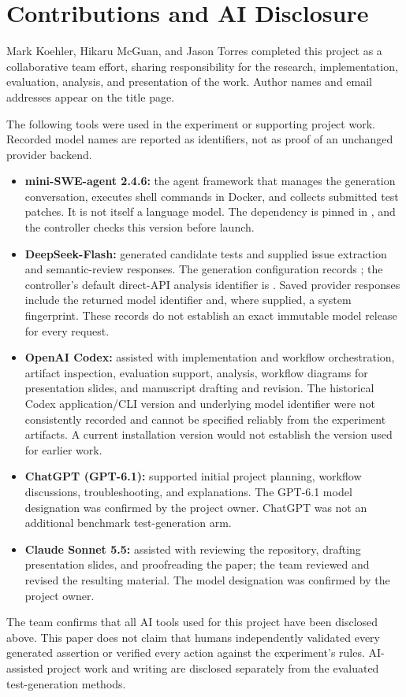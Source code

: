 \section{Contributions and AI Disclosure}\label{app:disclosure}
Mark Koehler, Hikaru McGuan, and Jason Torres completed this project as a collaborative team effort, sharing responsibility for the research, implementation, evaluation, analysis, and presentation of the work. Author names and email addresses appear on the title page.

The following tools were used in the experiment or supporting project work. Recorded model names are reported as identifiers, not as proof of an unchanged provider backend.

\begin{itemize}
\item \textbf{mini-SWE-agent 2.4.6:} the agent framework that manages the generation conversation, executes shell commands in Docker, and collects submitted test patches. It is not itself a language model. The dependency is pinned in , and the controller checks this version before launch.
\item \textbf{DeepSeek-Flash:} generated candidate tests and supplied issue extraction and semantic-review responses. The generation configuration records ; the controller's default direct-API analysis identifier is . Saved provider responses include the returned model identifier and, where supplied, a system fingerprint. These records do not establish an exact immutable model release for every request.
\item \textbf{OpenAI Codex:} assisted with implementation and workflow orchestration, artifact inspection, evaluation support, analysis, workflow diagrams for presentation slides, and manuscript drafting and revision. The historical Codex application/CLI version and underlying model identifier were not consistently recorded and cannot be specified reliably from the experiment artifacts. A current installation version would not establish the version used for earlier work.
\item \textbf{ChatGPT (GPT-6.1):} supported initial project planning, workflow discussions, troubleshooting, and explanations. The GPT-6.1 model designation was confirmed by the project owner. ChatGPT was not an additional benchmark test-generation arm.
\item \textbf{Claude Sonnet 5.5:} assisted with reviewing the repository, drafting presentation slides, and proofreading the paper; the team reviewed and revised the resulting material. The model designation was confirmed by the project owner.
\end{itemize}

The team confirms that all AI tools used for this project have been disclosed above. This paper does not claim that humans independently validated every generated assertion or verified every action against the experiment's rules. AI-assisted project work and writing are disclosed separately from the evaluated test-generation methods.
